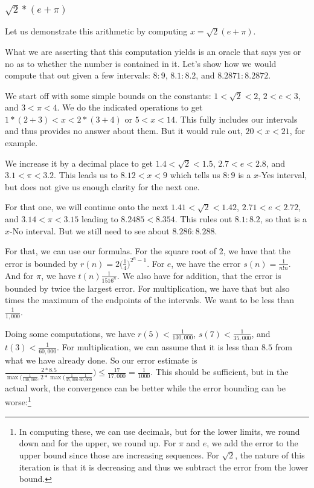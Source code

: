 \documentclass[12pt]{article}
\theoremstyle{remark}
\begin{document}
\subsubsection{$\sqrt{2}*(e + \pi)$}

Let us demonstrate this arithmetic by computing $x = \sqrt{2}(e + \pi)$. 

What we are asserting that this computation yields is an oracle that says yes or no as to whether the number is contained in it. Let's show how we would compute that out given a few intervals:  $8:9$, $8.1:8.2$, and $8.2871:8.2872$.

We start off with some simple bounds on the constants: $1 < \sqrt{2} < 2$, $2<e<3$, and $3 < \pi<4$. We do the indicated operations to get $1*(2+3) < x < 2*(3+4)$ or $5 < x< 14$. This fully includes our intervals and thus provides no answer about them. But it would rule out, $20 < x< 21$, for example. 

We increase it by a decimal place to get $1.4 < \sqrt{2} < 1.5$, $2.7<e<2.8$, and $3.1 < \pi<3.2$. This leads us to $8.12 < x < 9$ which tells us $8:9$ is a $x$-Yes interval, but does not give us enough clarity for the next one. 

For that one, we will continue onto the next $1.41 < \sqrt{2} < 1.42$, $2.71<e<2.72$, and $3.14 < \pi<3.15$ leading to $8.2485 < 8.354$. This rules out $8.1:8.2$, so that is a $x$-No interval. But we still need to see about $8.286:8.288$.

For that, we can use our formulas. For the square root of 2, we have that the error is bounded by $r(n) = 2\big(\frac{1}{4}\big)^{2^n-1}$. For $e$, we have the error $s(n) = \frac{1}{n!n}$. And for $\pi$, we have $t(n)\frac{1}{15 16^n}$. We also have for addition, that the error is bounded by twice the largest error. For multiplication, we have that but also times the maximum of the endpoints of the intervals. We want to be less than $\frac{1}{1,000}$. 

Doing some computations, we have $r(5) < \frac{1}{130,000}$, $s(7) < \frac{1}{35,000}$, and $t(3) < \frac{1}{60,000}$. For multiplication, we can assume that it is less than $8.5$ from what we have already done. So our error estimate is $\frac{2*8.5}{\max(\frac{1}{130,000}, 2*\max(\frac{1}{35,000}\frac{1}{60,000}}) \leq \frac{17}{17,000} = \frac{1}{1000}$. This should be sufficient, but in the actual work, the convergence can be better while the error bounding can be worse:\footnote{In computing these, we can use decimals, but for the lower limits, we round down and for the upper, we round up. For $\pi$ and $e$, we add the error to the upper bound since those are increasing sequences. For $\sqrt{2}$, the nature of this iteration is that it is decreasing and thus we subtract the error from the lower bound.} 
\end{document}
